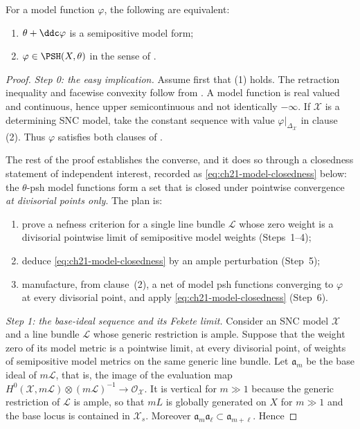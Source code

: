 \begin{theorem}\label{thm:ch21-model-consistency}
For a model function $\varphi$, the following are equivalent:

\begin{enumerate}
\item $\theta+\ddc\varphi$ is a semipositive model form;
\item $\varphi\in\PSH(X,\theta)$ in the sense of
.
\end{enumerate}
\end{theorem}

\begin{proof}
\emph{Step 0: the easy implication.}
Assume first that (1) holds.  The retraction inequality and facewise
convexity follow from .  A model
function is real valued and continuous, hence upper semicontinuous and not
identically $-\infty$.  If
$\mathcal X$ is a determining SNC model, take the constant sequence with
value $\varphi|_{\Delta_{\mathcal X}}$ in clause (2).  Thus
$\varphi$ satisfies both clauses of .

The rest of the proof establishes the converse, and it does so through a
closedness statement of independent interest, recorded as
\eqref{eq:ch21-model-closedness} below: the $\theta$-psh model functions
form a set that is closed under pointwise convergence \emph{at divisorial
points only}.  The plan is:
\begin{enumerate}
\item[(a)] prove a nefness criterion for a single line bundle
$\mathcal L$ whose zero weight is a divisorial pointwise limit of
semipositive model weights (Steps~1--4);
\item[(b)] deduce \eqref{eq:ch21-model-closedness} by an ample perturbation
(Step~5);
\item[(c)] manufacture, from clause~(2), a net of model psh functions
converging to $\varphi$ at every divisorial point, and apply
\eqref{eq:ch21-model-closedness} (Step~6).
\end{enumerate}

\emph{Step 1: the base-ideal sequence and its Fekete limit.}
Consider
an SNC model $\mathcal X$ and a line bundle $\mathcal L$ whose generic
restriction is ample.  Suppose that the weight zero of its model metric is a
pointwise limit, at every divisorial point, of weights of semipositive model
metrics on the same generic line bundle.  Let $\mathfrak a_m$ be the base
ideal of $m\mathcal L$, that is, the image of the evaluation map
$H^0(\mathcal X,m\mathcal L)\otimes(m\mathcal L)^{-1}\to
\mathcal O_{\mathcal X}$.  It is vertical for $m\gg1$ because the generic
restriction of $\mathcal L$ is ample, so that $mL$ is globally generated
on $X$ for $m\gg1$ and the base locus is contained in
$\mathcal X_s$.  Moreover
$\mathfrak a_m\mathfrak a_\ell\subset\mathfrak a_{m+\ell}$.  Hence


\end{proof}
